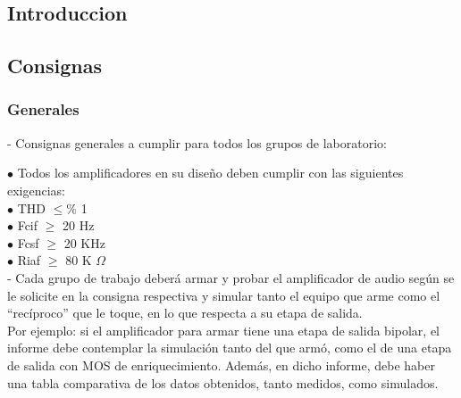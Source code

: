 \documentclass[12pt,a4paper]{report}
\begin{document}
\begin{flushleft}
\chapter{Introduccion}
\section{Consignas}
\subsection{Generales}
- Consignas generales a cumplir para todos los grupos de laboratorio: \par
\hspace{0.2cm} $ \bullet $ Todos los amplificadores en su diseño deben cumplir con las siguientes exigencias: \\
\hspace{1cm}   $ \bullet $ THD  $ \leq \% $ 1 \\
\hspace{1cm}   $ \bullet $ Fcif $ \geq $ 20 Hz \\
\hspace{1cm}   $ \bullet $ Fcsf $ \geq $ 20 KHz \\
\hspace{1cm}   $ \bullet $ Riaf $ \geq $ 80 K $ \Omega $ \\
- Cada grupo de trabajo deberá armar y probar el amplificador de audio según se le solicite en la consigna respectiva y simular tanto el equipo que arme como el “recíproco” que le toque, en lo que respecta a su etapa de salida. 
\\ Por ejemplo: si el amplificador para armar tiene una etapa de salida bipolar, el informe debe contemplar la simulación tanto del que armó, como el de una etapa de salida con MOS de enriquecimiento. Además, en dicho informe, debe haber una tabla  comparativa de los datos obtenidos, tanto medidos, como simulados. \\
\vspace{0.1cm}

\end{flushleft}
\end{document}
